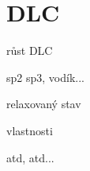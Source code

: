 \chapter{DLC}
\setcounter{page}{1}

růst DLC

sp2 sp3, vodík...

relaxovaný stav

vlastnosti

atd, atd...

\cleardoublepage
